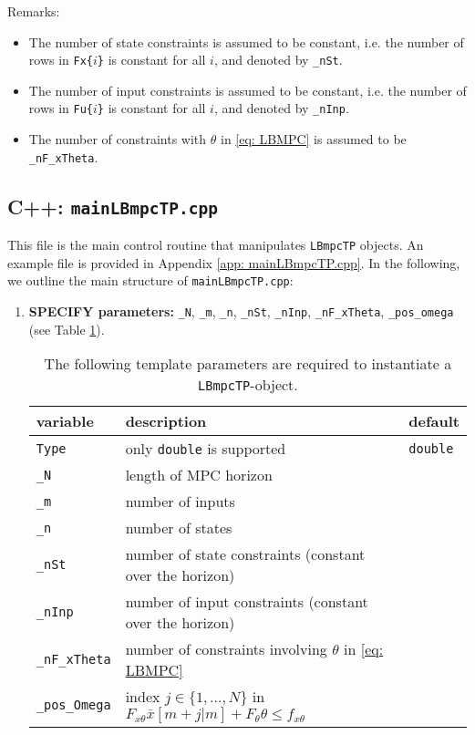 \documentclass[letter]{article}
\begin{document}
\begin{sffamily}
\noindent
Remarks:
\begin{itemize}
	\item The number of state constraints is assumed to be constant, i.e. the number of rows in \texttt{Fx\{$i$\}} is constant for all $i$, and  denoted by \texttt{\_nSt}.
	\item The number of input constraints is assumed to be constant, i.e. the number of rows in \texttt{Fu\{$i$\}} is constant for all $i$, and denoted by \texttt{\_nInp}.
	\item The number of constraints with $\theta$ in \eqref{eq: LBMPC} is assumed to be \texttt{\_nF\_xTheta}.
\end{itemize}


\subsection{C++: \texttt{mainLBmpcTP.cpp}}
This file is the main control routine that manipulates \texttt{LBmpcTP} objects. An example file is provided in Appendix \ref{app: mainLBmpcTP.cpp}. In the following, we outline the main structure of \texttt{mainLBmpcTP.cpp}:

\begin{enumerate}
	\item \textbf{SPECIFY parameters:} \texttt{\_N}, \texttt{\_m}, \texttt{\_n}, \texttt{\_nSt}, \texttt{\_nInp}, \texttt{\_nF\_xTheta}, \texttt{\_pos\_omega} (see Table \ref{tab: instantiateLBpmcTP}).
	
		\begin{table}[!htdp]
		\caption{The following template parameters are required to instantiate a \texttt{LBmpcTP}-object.}
		\begin{center}
		\begin{tabular}{|l|l|l|}\hline
		{
 			\bf variable} & description & default \\ \hline \hline
 
			\texttt{Type} & only \texttt{double} is supported & \texttt{double} \\ \hline
 			\texttt{\_N} & length of MPC horizon & \\ 
 			\texttt{\_m} & number of inputs & \\ 
 			\texttt{\_n} & number of states & \\ \hline 
 			\texttt{\_nSt} & number of state constraints (constant over the horizon) & \\ 
 			\texttt{\_nInp} & number of input constraints (constant over the horizon) & \\ 
	 		\texttt{\_nF\_xTheta} & number of constraints involving $\theta$ in \eqref{eq: LBMPC} & \\ \hline
 			\texttt{\_pos\_Omega} & index $j\in\{1,\ldots,N\}$ in $F_{x\theta}\bar{x}[m+j|m] + F_\theta \theta \leq f_{x\theta}$ & \\ \hline 
		\end{tabular}
		\end{center}
		\label{tab: instantiateLBpmcTP}
		\end{table}	
	

\end{enumerate}
\end{sffamily}
\end{document}
